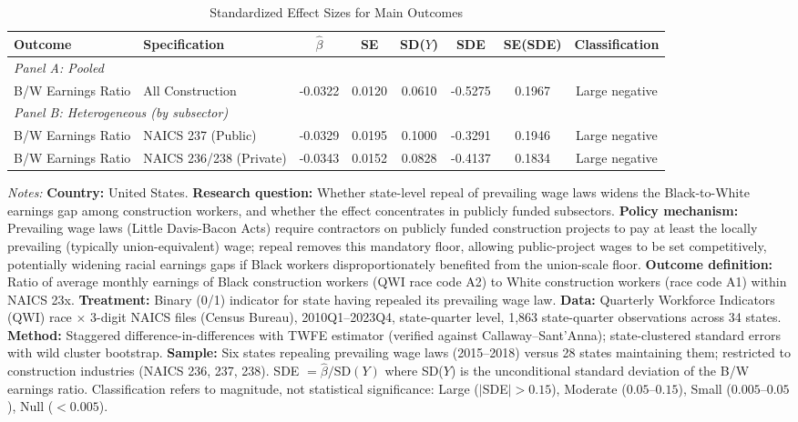 \begin{table}[H]
\centering
\caption{Standardized Effect Sizes for Main Outcomes}
\label{tab:sde}
\begin{threeparttable}
\begin{adjustbox}{max width=\textwidth}
\begin{tabular}{llcccccc}
\toprule
Outcome & Specification & $\hat{\beta}$ & SE & SD($Y$) & SDE & SE(SDE) & Classification \\
\midrule
\multicolumn{8}{l}{\textit{Panel A: Pooled}} \\
B/W Earnings Ratio & All Construction & -0.0322 & 0.0120 & 0.0610 & -0.5275 & 0.1967 & Large negative \\
\midrule
\multicolumn{8}{l}{\textit{Panel B: Heterogeneous (by subsector)}} \\
B/W Earnings Ratio & NAICS 237 (Public) & -0.0329 & 0.0195 & 0.1000 & -0.3291 & 0.1946 & Large negative \\
B/W Earnings Ratio & NAICS 236/238 (Private) & -0.0343 & 0.0152 & 0.0828 & -0.4137 & 0.1834 & Large negative \\
\bottomrule
\end{tabular}
\end{adjustbox}
\end{threeparttable}
\par\vspace{0.3em}
{\footnotesize \textit{Notes:} \textbf{Country:} United States. \textbf{Research question:} Whether state-level repeal of prevailing wage laws widens the Black-to-White earnings gap among construction workers, and whether the effect concentrates in publicly funded subsectors. \textbf{Policy mechanism:} Prevailing wage laws (Little Davis-Bacon Acts) require contractors on publicly funded construction projects to pay at least the locally prevailing (typically union-equivalent) wage; repeal removes this mandatory floor, allowing public-project wages to be set competitively, potentially widening racial earnings gaps if Black workers disproportionately benefited from the union-scale floor. \textbf{Outcome definition:} Ratio of average monthly earnings of Black construction workers (QWI race code A2) to White construction workers (race code A1) within NAICS 23x. \textbf{Treatment:} Binary (0/1) indicator for state having repealed its prevailing wage law. \textbf{Data:} Quarterly Workforce Indicators (QWI) race $\times$ 3-digit NAICS files (Census Bureau), 2010Q1--2023Q4, state-quarter level, 1,863 state-quarter observations across 34 states. \textbf{Method:} Staggered difference-in-differences with TWFE estimator (verified against Callaway--Sant'Anna); state-clustered standard errors with wild cluster bootstrap. \textbf{Sample:} Six states repealing prevailing wage laws (2015--2018) versus 28 states maintaining them; restricted to construction industries (NAICS 236, 237, 238). SDE $= \hat{\beta} / \text{SD}(Y)$ where SD($Y$) is the unconditional standard deviation of the B/W earnings ratio. Classification refers to magnitude, not statistical significance: Large ($|$SDE$| > 0.15$), Moderate ($0.05$--$0.15$), Small ($0.005$--$0.05$), Null ($< 0.005$).}
\end{table}
